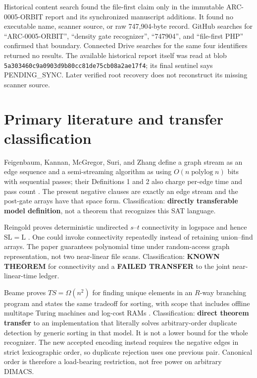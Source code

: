 \documentclass[11pt]{article}
\begin{document}
Historical content search found the file-first claim only in the immutable
ARC-0005-ORBIT report and its synchronized manuscript additions.  It found no
executable name, scanner source, or raw 747,904-byte record.  GitHub searches
for ``ARC-0005-ORBIT'', ``density gate recognizer'', ``747904'', and
``file-first PHP'' confirmed that boundary.  Connected Drive searches for
the same four identifiers returned no results.  The available historical
report itself was read at blob
\texttt{5a303460c9a0903d9b80cc81de75cb08a2ae17f4}; its final sentinel says
PENDING\_SYNC.  Later verified root recovery does not reconstruct its missing
scanner source.

\section{Primary literature and transfer classification}
Feigenbaum, Kannan, McGregor, Suri, and Zhang define a graph stream as an
edge sequence and a semi-streaming algorithm as using
$O(n\operatorname{polylog}n)$ bits with sequential passes; their Definitions
1 and 2 also charge per-edge time and pass count \cite{rsr0005Semistream}.
The present negative clauses are exactly an edge stream and the post-gate
arrays have that space form.  Classification: \textbf{directly transferable
model definition}, not a theorem that recognizes this SAT language.

Reingold proves deterministic undirected $s$--$t$ connectivity in logspace
and hence $\mathrm{SL}=\mathrm L$ \cite{rsr0005Reingold}.  One could invoke
connectivity repeatedly instead of retaining union--find arrays.  The paper
guarantees polynomial time under random-access graph representation, not
two near-linear file scans.  Classification: \textbf{KNOWN THEOREM} for
connectivity and a \textbf{FAILED TRANSFER} to the joint near-linear-time
ledger.

Beame proves $TS=\Omega(n^2)$ for finding unique elements in an $R$-way
branching program and states the same tradeoff for sorting, with scope that
includes offline multitape Turing machines and log-cost RAMs
\cite{rsr0005Beame}.  Classification: \textbf{direct theorem transfer} to an
implementation that literally solves arbitrary-order duplicate detection by
generic sorting in that model.  It is not a lower bound for the whole
recognizer.  The new accepted encoding instead requires the negative edges in
strict lexicographic order, so duplicate rejection uses one previous pair.
Canonical order is therefore a load-bearing restriction, not free power on
arbitrary DIMACS.
\end{document}
